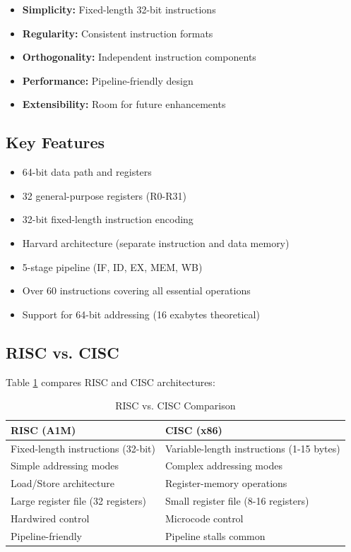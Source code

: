 \documentclass[12pt,a4paper,oneside]{book}
\begin{document}
\begin{itemize}
    \item \textbf{Simplicity:} Fixed-length 32-bit instructions
    \item \textbf{Regularity:} Consistent instruction formats
    \item \textbf{Orthogonality:} Independent instruction components
    \item \textbf{Performance:} Pipeline-friendly design
    \item \textbf{Extensibility:} Room for future enhancements
\end{itemize}

\subsection{Key Features}

\begin{itemize}
    \item 64-bit data path and registers
    \item 32 general-purpose registers (R0-R31)
    \item 32-bit fixed-length instruction encoding
    \item Harvard architecture (separate instruction and data memory)
    \item 5-stage pipeline (IF, ID, EX, MEM, WB)
    \item Over 60 instructions covering all essential operations
    \item Support for 64-bit addressing (16 exabytes theoretical)
\end{itemize}

\subsection{RISC vs. CISC}

Table \ref{tab:risc-cisc} compares RISC and CISC architectures:

\begin{table}[H]
\centering
\caption{RISC vs. CISC Comparison}
\label{tab:risc-cisc}
\begin{tabularx}{\textwidth}{|X|X|}
\hline
\textbf{RISC (A1M)} & \textbf{CISC (x86)} \\
\hline
Fixed-length instructions (32-bit) & Variable-length instructions (1-15 bytes) \\
\hline
Simple addressing modes & Complex addressing modes \\
\hline
Load/Store architecture & Register-memory operations \\
\hline
Large register file (32 registers) & Small register file (8-16 registers) \\
\hline
Hardwired control & Microcode control \\
\hline
Pipeline-friendly & Pipeline stalls common \\
\hline
\end{tabularx}
\end{table}
\end{document}
